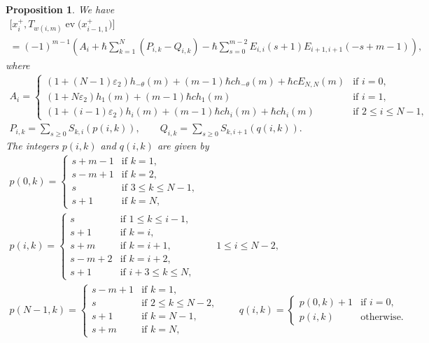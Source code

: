\documentclass[pdftex]{sigma}
\newtheorem{prop}[thm]{Proposition}
\theoremstyle{definition}
\numberwithin{equation}{section}
\DeclareMathOperator{\ev}{ev}
\newcommand{\ve}{\varepsilon}
\begin{document}
\begin{prop}\label{prop:braket}
We have
\begin{gather}
\big[x_i^+, T_{w(i,m)} \ev\big(x_{i-1,1}^+\big)\big] \nonumber\\
= (-1)^{m-1} \left(A_i + \hbar \sum_{k=1}^N (P_{i,k}-Q_{i,k}) - \hbar \sum_{s=0}^{m-2} E_{i,i}(s+1)E_{i+1,i+1}(-s+m-1) \right),\label{eq:braket}
\end{gather}
where
\begin{gather*}
A_i = \begin{cases}
(1+(N-1)\ve_2)h_{-\theta}(m) + (m-1)\hbar ch_{-\theta}(m)+ \hbar c E_{N,N}(m) & \text{if $i=0$}, \\
(1+N\ve_2)h_1(m) + (m-1)\hbar ch_{1}(m)& \text{if $i=1$}, \\
(1+(i-1)\ve_2)h_{i}(m) + (m-1)\hbar ch_{i}(m) + \hbar c h_{i}(m) & \text{if $2 \leq i \leq N-1$},
\end{cases}
\\
P_{i,k} = \sum_{s \geq 0} S_{k,i}(p(i,k)), \qquad Q_{i,k} = \sum_{s \geq 0} S_{k,i+1}(q(i,k)).
\end{gather*}
The integers $p(i,k)$ and $q(i,k)$ are given by
\begin{gather*}
p(0,k)= \begin{cases}
s+m-1 & \text{if $k=1$},\\
s-m+1 & \text{if $k=2$},\\
s & \text{if $3 \leq k \leq N-1$},\\
s+1 & \text{if $k=N$},
\end{cases}\\
p(i,k)= \begin{cases}
s & \text{if $1 \leq k \leq i-1$},\\
s+1 & \text{if $k=i$},\\
s+m & \text{if $k=i+1$},\\
s-m+2 & \text{if $k=i+2$},\\
s+1 & \text{if $i+3 \leq k \leq N$},
\end{cases}\qquad 1 \leq i \leq N-2,\\
p(N-1,k)= \begin{cases}
s-m+1 & \text{if $k=1$},\\
s & \text{if $2 \leq k \leq N-2$},\\
s+1 & \text{if $k=N-1$},\\
s+m & \text{if $k=N$},
\end{cases}\qquad
q(i,k)=\begin{cases}
p(0,k)+1 & \text{if $i=0$},\\
p(i,k) &\text{otherwise}.
\end{cases}
\end{gather*}
\end{prop}
\end{document}
